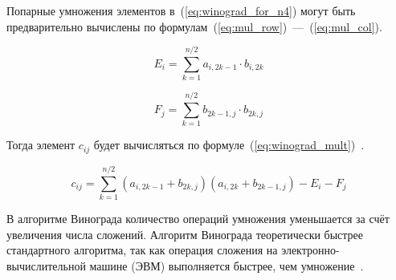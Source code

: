 Попарные умножения элементов в~(\ref{eq:winograd_for_n4}) могут быть предварительно вычислены по формулам~(\ref{eq:mul_row})~---~(\ref{eq:mul_col}).

\begin{equation}
    \label{eq:mul_row}
    E_i = \sum_{k=1}^{n/2} a_{i, 2k - 1} \cdot b_{i,2k} 
\end{equation}

\begin{equation}
    \label{eq:mul_col}
    F_j = \sum_{k=1}^{n/2} b_{2k - 1, j} \cdot b_{2k,j} 
\end{equation}

Тогда элемент $c_{ij}$ будет вычисляться по формуле~(\ref{eq:winograd_mult})~\cite{winograd}.

\begin{equation}
    \label{eq:winograd_mult}
    c_{ij} = \sum_{k=1}^{n/2} (a_{i, 2k-1} + b_{2k,j}) (a_{i, 2k} + b_{2k-1,j}) - E_i - F_j
\end{equation}

В алгоритме Винограда количество операций умножения уменьшается за счёт увеличения числа сложений. Алгоритм Винограда теоретически быстрее стандартного алгоритма, так как операция сложения на электронно-вычислительной машине (ЭВМ) выполняется быстрее, чем умножение~\cite{winograd}.
